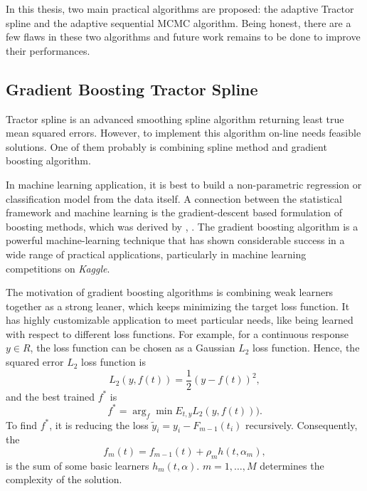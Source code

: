 
In this thesis, two main practical algorithms are proposed: the adaptive Tractor spline and the adaptive sequential MCMC algorithm. Being honest, there are a few flaws in these two algorithms and future work remains to be done to improve their performances. 


\subsection*{Gradient Boosting Tractor Spline}

Tractor spline is an advanced smoothing spline algorithm returning least true mean squared errors. However, to implement this algorithm on-line needs feasible solutions. One of them probably is combining spline method and gradient boosting algorithm. 


In machine learning application, it is best to build a non-parametric regression or classification model from the data itself. A connection between the statistical framework and machine learning is the gradient-descent based formulation of boosting methods, which was derived by \cite{freund1995desicion}, \cite{friedman2001greedy}. The gradient boosting algorithm is a powerful machine-learning technique that has shown considerable success in a wide range of practical applications, particularly in machine learning competitions on \textit{Kaggle}. 


The motivation of gradient boosting algorithms is combining weak learners together as a strong leaner, which keeps minimizing the target loss function. 
It has highly customizable application to meet particular needs, like being learned with respect to different loss functions. For example, for a continuous response $y\in \mathit{R}$, the loss function can be chosen as a Gaussian $L_2$ loss function. Hence, the squared error $L_2$ loss function is 
\begin{equation*}
L_2(y,f(t)) = \frac{1}{2}\left(y-f(t)\right)^2,
\end{equation*}
and the best trained $f^*$ is 
\begin{equation*}
f^* = \arg_{f}\min E_{t,y}L_2(y,f(t))).
\end{equation*}
To find $f^*$, it is reducing the loss $\tilde{y}_i=y_i-F_{m-1}(t_i)$ recursively. Consequently, the 
\begin{equation*}
f_m(t) = f_{m-1}(t)+ \rho_mh(t,\alpha_m),
\end{equation*}
is the sum of some basic learners $h_m(t,\alpha)$. $m=1,\ldots,M$ determines the complexity of the solution. 


